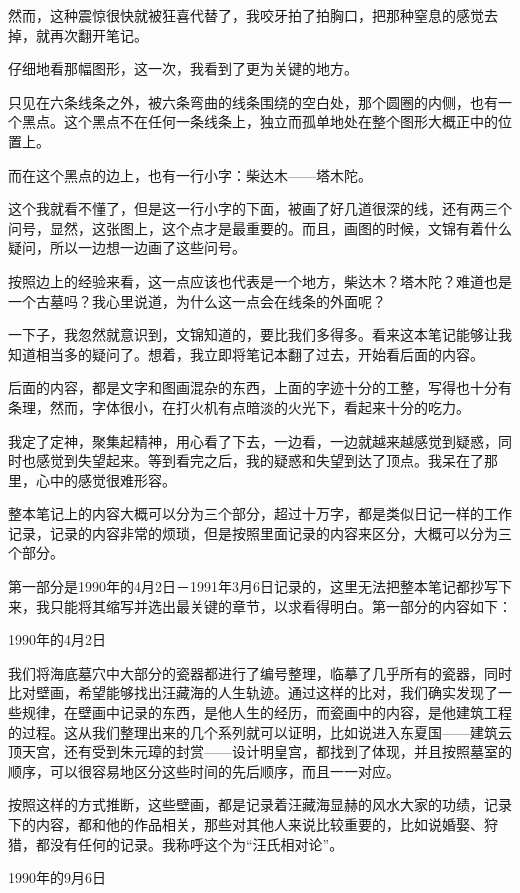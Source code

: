 然而，这种震惊很快就被狂喜代替了，我咬牙拍了拍胸口，把那种窒息的感觉去掉，就再次翻开笔记。

仔细地看那幅图形，这一次，我看到了更为关键的地方。

只见在六条线条之外，被六条弯曲的线条围绕的空白处，那个圆圈的内侧，也有一个黑点。这个黑点不在任何一条线条上，独立而孤单地处在整个图形大概正中的位置上。

而在这个黑点的边上，也有一行小字：柴达木——塔木陀。

这个我就看不懂了，但是这一行小字的下面，被画了好几道很深的线，还有两三个问号，显然，这张图上，这个点才是最重要的。而且，画图的时候，文锦有着什么疑问，所以一边想一边画了这些问号。

按照边上的经验来看，这一点应该也代表是一个地方，柴达木？塔木陀？难道也是一个古墓吗？我心里说道，为什么这一点会在线条的外面呢？

一下子，我忽然就意识到，文锦知道的，要比我们多得多。看来这本笔记能够让我知道相当多的疑问了。想着，我立即将笔记本翻了过去，开始看后面的内容。

后面的内容，都是文字和图画混杂的东西，上面的字迹十分的工整，写得也十分有条理，然而，字体很小，在打火机有点暗淡的火光下，看起来十分的吃力。

我定了定神，聚集起精神，用心看了下去，一边看，一边就越来越感觉到疑惑，同时也感觉到失望起来。等到看完之后，我的疑惑和失望到达了顶点。我呆在了那里，心中的感觉很难形容。

整本笔记上的内容大概可以分为三个部分，超过十万字，都是类似日记一样的工作记录，记录的内容非常的烦琐，但是按照里面记录的内容来区分，大概可以分为三个部分。

第一部分是1990年的4月2日－1991年3月6日记录的，这里无法把整本笔记都抄写下来，我只能将其缩写并选出最关键的章节，以求看得明白。第一部分的内容如下：

1990年的4月2日

我们将海底墓穴中大部分的瓷器都进行了编号整理，临摹了几乎所有的瓷器，同时比对壁画，希望能够找出汪藏海的人生轨迹。通过这样的比对，我们确实发现了一些规律，在壁画中记录的东西，是他人生的经历，而瓷画中的内容，是他建筑工程的过程。这从我们整理出来的几个系列就可以证明，比如说进入东夏国——建筑云顶天宫，还有受到朱元璋的封赏——设计明皇宫，都找到了体现，并且按照墓室的顺序，可以很容易地区分这些时间的先后顺序，而且一一对应。

按照这样的方式推断，这些壁画，都是记录着汪藏海显赫的风水大家的功绩，记录下的内容，都和他的作品相关，那些对其他人来说比较重要的，比如说婚娶、狩猎，都没有任何的记录。我称呼这个为“汪氏相对论”。

1990年的9月6日

